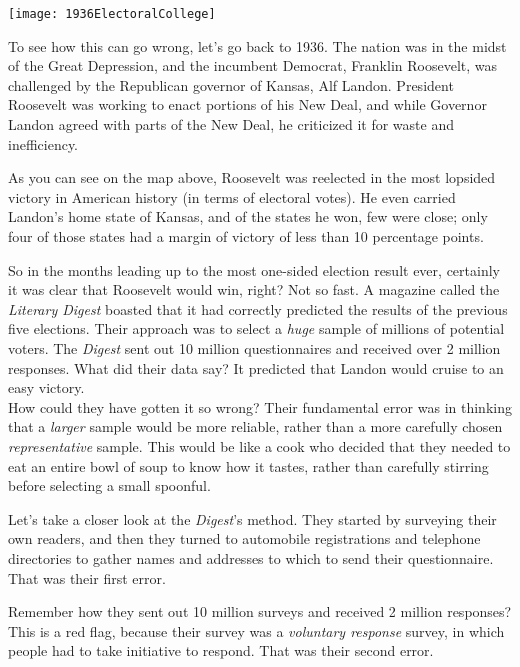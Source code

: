 \begin{center}
\texttt{[image: 1936ElectoralCollege]}
\end{center}

To see how this can go wrong, let's go back to 1936.  The nation was in the midst of the Great Depression, and the incumbent Democrat, Franklin Roosevelt, was challenged by the Republican governor of Kansas, Alf Landon.  President Roosevelt was working to enact portions of his New Deal, and while Governor Landon agreed with parts of the New Deal, he criticized it for waste and inefficiency.

As you can see on the map above, Roosevelt was reelected in the most lopsided victory in American history (in terms of electoral votes).  He even carried Landon's home state of Kansas, and of the states he won, few were close; only four of those states had a margin of victory of less than 10 percentage points.

So in the months leading up to the most one-sided election result ever, certainly it was clear that Roosevelt would win, right?  Not so fast.  A magazine called the \emph{Literary Digest} boasted that it had correctly predicted the results of the previous five elections.  Their approach was to select a \emph{huge} sample of millions of potential voters.  The \emph{Digest} sent out 10 million questionnaires and received over 2 million responses.  What did their data say?  It predicted that Landon would cruise to an easy victory.\\

How could they have gotten it so wrong?  Their fundamental error was in thinking that a \emph{larger} sample would be more reliable, rather than a more carefully chosen \emph{representative} sample.  This would be like a cook who decided that they needed to eat an entire bowl of soup to know how it tastes, rather than carefully stirring before selecting a small spoonful.

Let's take a closer look at the \emph{Digest}'s method.  They started by surveying their own readers, and then they turned to automobile registrations and telephone directories to gather names and addresses to which to send their questionnaire.  That was their first error.

Remember how they sent out 10 million surveys and received 2 million responses?  This is a red flag, because their survey was a \emph{voluntary response} survey, in which people had to take initiative to respond.  That was their second error.

